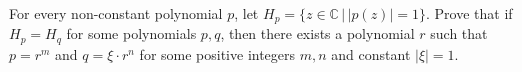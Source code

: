 For every non-constant polynomial $p$, let $H_p=\big\{z\in \mathbb{C} \, \big| \, |p(z)|=1\big\}$. Prove that if $H_p=H_q$ for some polynomials $p,q$, then there exists a polynomial $r$ such that $p=r^m$ and $q=\xi\cdot r^n$ for some positive integers $m,n$ and constant $|\xi|=1$.